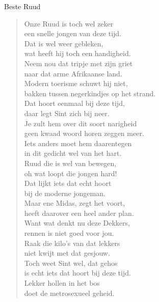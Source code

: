 \documentclass[12pt]{brief}
\date{12 augustus 2006}
\begin{document}
\begin{letter}{Beste Ruud}

\opening{}


\begin{verse}

Onze Ruud is toch wel zeker\\
een snelle jongen van deze tijd.\\
Dat is wel weer gebleken,\\
wat heeft hij toch een handigheid.\\[1.5em]

Neem nou dat tripje met zijn griet\\
naar dat arme Afrikaanse land.\\
Modern toerisme schuwt hij niet,\\
bakken tussen negerkindjes op het strand.\\[1.5em]

Dat hoort eenmaal bij deze tijd,\\
daar legt Sint zich bij neer.\\
Je zult hem over dit soort narigheid\\
geen kwaad woord horen zeggen meer.\\[1.5em]

Iets anders moet hem daarentegen\\
in dit gedicht wel van het hart.\\
Ruud die is wel van bewegen,\\
oh wat loopt die jongen hard!\\[1.5em]

Dat lijkt iets dat echt hoort\\
bij de moderne jongeman.\\
Maar ene Midas, zegt het voort,\\
heeft daarover een heel ander plan.\\[1.5em]

Want wat denkt nu deze Dekkers,\\
rennen is niet goed voor jou.\\
Raak die kilo's van dat lekkers\\
niet kwijt met dat gesjouw.\\[1.5em]

Toch weet Sint wel, dat gehos\\
is echt iets dat hoort bij deze tijd.\\
Lekker hollen in het bos\\
doet de metrosexueel geheid.\\[1.5em]


\end{verse}
\end{letter}
\end{document}

